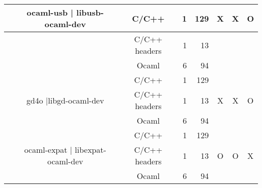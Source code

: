 \documentclass[11pt,a4paper]{article}
\begin{document}
\begin{table}[h,t]
\begin{tabular}{|>{\centering}m{3cm}| c|c|r|r| c| c|c|}
&\multirow{3}{3cm}{ocaml-usb | libusb-ocaml-dev} & C/C++ & 1 & 129 & \multirow{3}{*}{X} & \multirow{3}{*}{X} & \multirow{3}{*}{O}\\
\cline{3-5}
& &                           C/C++ headers & 1 & 13 & & & \\
\cline{3-5}
& &                          Ocaml & 6 & 94 & & & \\
\cline{2-8}


 &\multirow{3}{3cm}{gd4o |libgd-ocaml-dev} & C/C++ & 1 & 129 & \multirow{3}{*}{X} & \multirow{3}{*}{X} & \multirow{3}{*}{O}\\
\cline{3-5}
& &                           C/C++ headers & 1 & 13 & & & \\
\cline{3-5}
& &                          Ocaml & 6 & 94 & & & \\
\cline{2-8}






 &\multirow{3}{3cm}{ocaml-expat | libexpat-ocaml-dev} & C/C++ & 1 & 129 & \multirow{3}{*}{O} & \multirow{3}{*}{O} & \multirow{3}{*}{X}\\
\cline{3-5}
& &                           C/C++ headers & 1 & 13 & & & \\
\cline{3-5}
& &                          Ocaml & 6 & 94 & & & \\
\hline




\end{tabular}
\end{table}

\end{document}
